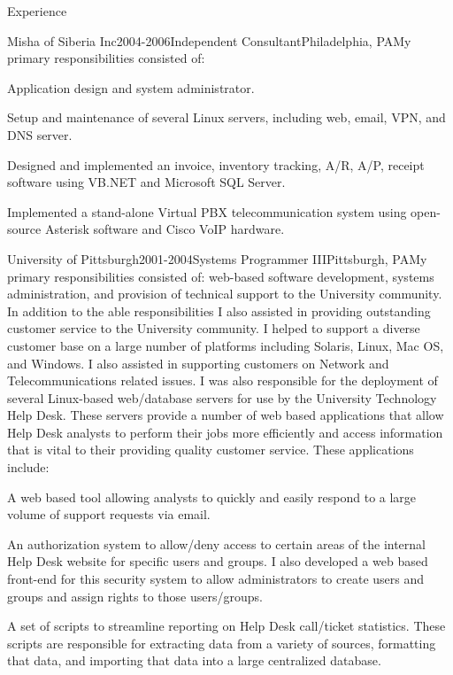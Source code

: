 \documentclass[12pt]{resume}
\begin{document}
\begin{rSection}{Experience}

\begin{rSubsection}{Misha of Siberia Inc}{2004-2006}{Independent Consultant}{Philadelphia, PA}{My primary responsibilities consisted of:}
\item Application design and system administrator.
\item Setup and maintenance of several Linux servers, including web, email, VPN, and DNS server.
\item Designed and implemented an invoice, inventory tracking, A/R, A/P, receipt software using VB.NET and Microsoft SQL Server.
\item Implemented a stand-alone Virtual PBX telecommunication system using open-source Asterisk software and Cisco VoIP hardware.
\end{rSubsection}


\begin{rSubsection}{University of Pittsburgh}{2001-2004}{Systems Programmer III}{Pittsburgh, PA}{My primary responsibilities consisted of: web-based software development, systems administration, and provision of technical support to the University community. In addition to the able responsibilities I also assisted in providing outstanding customer service to the University community. I helped to support a diverse customer base on a large number of platforms including Solaris, Linux, Mac OS, and Windows. I also assisted in supporting customers on Network and Telecommunications related issues. I was also responsible for the deployment of several Linux-based web/database servers for use by the University Technology Help Desk. These servers provide a number of web based applications that allow Help Desk analysts to perform their jobs more efficiently and access information that is vital to their providing quality customer service. These applications include:}
\item A web based tool allowing analysts to quickly and easily respond to a large volume of support requests via email.
\item An authorization system to allow/deny access to certain areas of the internal Help Desk website for specific users and groups. I also developed a web based front-end for this security system to allow administrators to create users and groups and assign rights to those users/groups.
\item A set of scripts to streamline reporting on Help Desk call/ticket statistics. These scripts are responsible for extracting data from a variety of sources, formatting that data, and importing that data into a large centralized database.
\end{rSubsection}

\end{rSection}
\end{document}
